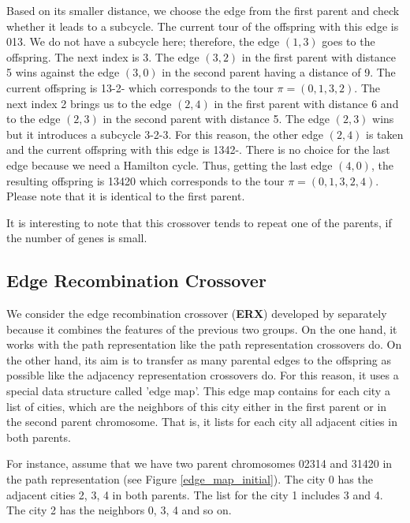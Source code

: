 Based on its smaller distance, we choose the edge from the first parent and check whether it leads to a subcycle. The current tour of the offspring with this edge is 013. We do not have a subcycle here; therefore, the edge $(1, 3)$ goes to the offspring. The next index is 3. The edge $(3, 2)$ in the first parent with distance 5 wins against the edge $(3, 0)$ in the second parent having a distance of 9. The current offspring is 13-2- which corresponds to the tour $\pi = (0, 1, 3, 2)$. The next index 2 brings us to the edge $(2, 4)$ in the first parent with distance 6 and to the edge $(2, 3)$ in the second parent with distance 5. The edge $(2, 3)$ wins but it introduces a subcycle 3-2-3. For this reason, the other edge $(2, 4)$ is taken and the current offspring with this edge is 1342-. There is no choice for the last edge because we need a Hamilton cycle. Thus, getting the last edge $(4, 0)$, the resulting offspring is 13420 which corresponds to the tour $\pi = (0, 1, 3, 2, 4)$. Please note that it is identical to the first parent.
 
It is interesting to note that this crossover tends to repeat one of the parents, if the number of genes is small.

\subsection{Edge Recombination Crossover}
\label{subsec:edge_recombination}
We consider the edge recombination crossover (\textbf{ERX}) developed by \citeauthor{whitley1989scheduling} \cite{whitley1989scheduling} separately because it combines the features of the previous two groups. On the one hand, it works with the path representation like the path representation crossovers do. On the other hand, its aim is to transfer as many parental edges to the offspring as possible like the adjacency representation crossovers do. For this reason, it uses a special data structure called 'edge map'. This edge map contains for each city a list of cities, which are the neighbors of this city either in the first parent or in the second parent chromosome. That is, it lists for each city all adjacent cities in both parents. \par

For instance, assume that we have two parent chromosomes 02314 and 31420 in the path representation (see Figure \ref{edge_map_initial}). The city 0 has the adjacent cities 2, 3, 4 in both parents. The list for the city 1 includes 3 and 4. The city 2 has the neighbors 0, 3, 4 and so on. 

